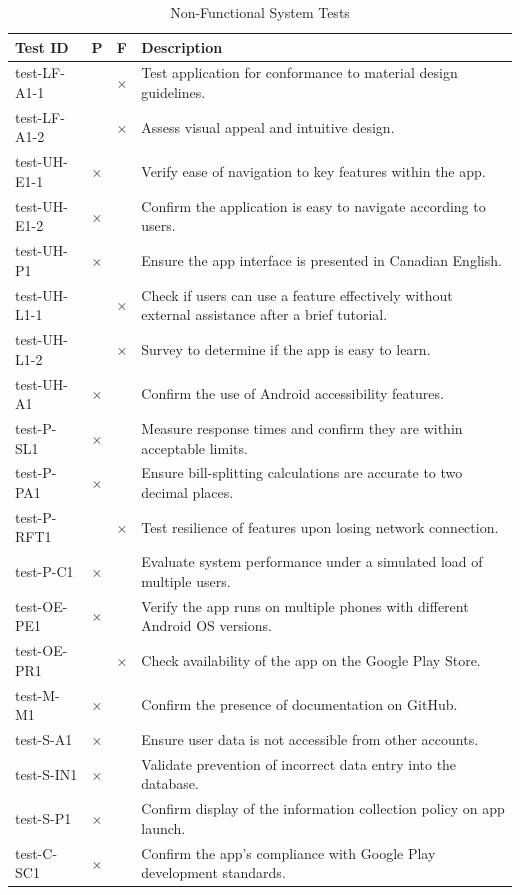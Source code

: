 \documentclass[12pt, titlepage]{article}
\begin{document}
\begin{table}[H]
\centering
\begin{tabular}{|l|c|c|p{8cm}|}
\hline
Test ID & P & F & Description \\
\hline
test-LF-A1-1 & & $\times$ & Test application for conformance to material design guidelines. \\
\hline
test-LF-A1-2 & & $\times$ & Assess visual appeal and intuitive design. \\
\hline
test-UH-E1-1 & $\times$ & & Verify ease of navigation to key features within the app. \\
\hline
test-UH-E1-2 & $\times$ & & Confirm the application is easy to navigate according to users. \\
\hline
test-UH-P1 & $\times$ & & Ensure the app interface is presented in Canadian English. \\
\hline
test-UH-L1-1 & & $\times$ & Check if users can use a feature effectively without external assistance after a brief tutorial. \\
\hline
test-UH-L1-2 & & $\times$ & Survey to determine if the app is easy to learn. \\
\hline
test-UH-A1 & $\times$ & & Confirm the use of Android accessibility features. \\
\hline
test-P-SL1 & $\times$ & & Measure response times and confirm they are within acceptable limits. \\
\hline
test-P-PA1 & $\times$ & & Ensure bill-splitting calculations are accurate to two decimal places. \\
\hline
test-P-RFT1 & & $\times$ & Test resilience of features upon losing network connection. \\
\hline
test-P-C1 & $\times$ & & Evaluate system performance under a simulated load of multiple users. \\
\hline
test-OE-PE1 & $\times$ & & Verify the app runs on multiple phones with different Android OS versions. \\
\hline
test-OE-PR1 & & $\times$ & Check availability of the app on the Google Play Store. \\
\hline
test-M-M1 & $\times$ & & Confirm the presence of documentation on GitHub. \\
\hline
test-S-A1 & $\times$ & & Ensure user data is not accessible from other accounts. \\
\hline
test-S-IN1 & $\times$ & & Validate prevention of incorrect data entry into the database. \\
\hline
test-S-P1 & $\times$ & & Confirm display of the information collection policy on app launch. \\
\hline
test-C-SC1 & $\times$ & & Confirm the app's compliance with Google Play development standards. \\
\hline
\end{tabular}
\caption{Non-Functional System Tests}
\label{tab:nonfunctional_tests}
\end{table}
\end{document}

